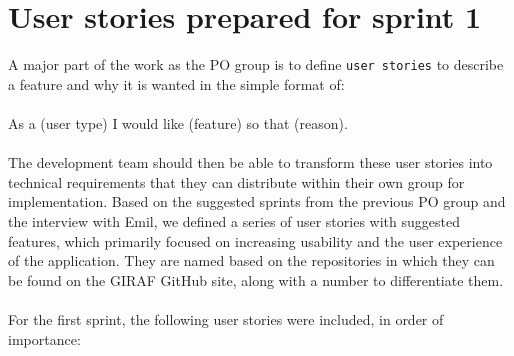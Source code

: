 \section{User stories prepared for sprint 1}
A major part of the work as the PO group is to define \texttt{user stories} to describe a feature and why it is wanted in the simple format of:
\\\\
As a (user type) I would like (feature) so that (reason).
\\\\
The development team should then be able to transform these user stories into technical requirements that they can distribute within their own group for implementation.
Based on the suggested sprints from the previous PO group and the interview with Emil, we defined a series of user stories with suggested features, which primarily focused on increasing usability and the user experience of the application.
They are named based on the repositories in which they can be found on the GIRAF GitHub site, along with a number to differentiate them.
\\\\
For the first sprint, the following user stories were included, in order of importance:

